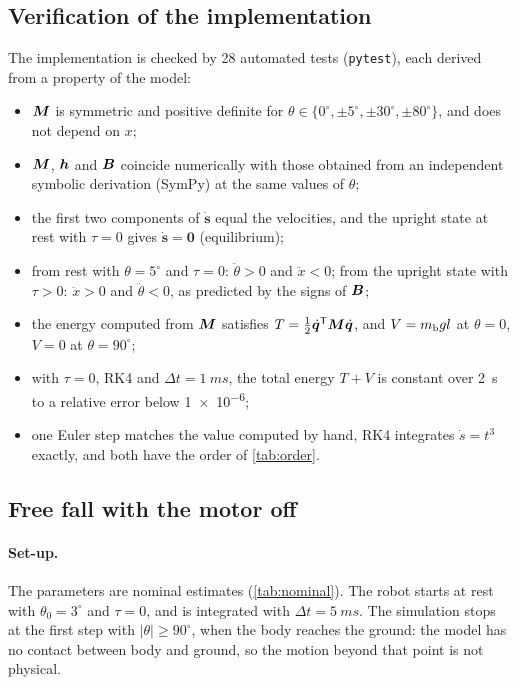 \subsection{Verification of the implementation}

The implementation is checked by 28 automated tests (\texttt{pytest}), each
derived from a property of the model:
\begin{itemize}
  \item $\bm{M}$ is symmetric and positive definite for
        $\theta\in\{0^\circ,\pm5^\circ,\pm30^\circ,\pm80^\circ\}$, and does
        not depend on $x$;
  \item $\bm{M}$, $\bm{h}$ and $\bm{B}$ coincide numerically with those obtained from an
        independent symbolic derivation (SymPy) at the same values of $\theta$;
  \item the first two components of $\dot{\bm s}$ equal the velocities, and
        the upright state at rest with $\tau = 0$ gives $\dot{\bm s} = \bm 0$
        (equilibrium);
  \item from rest with $\theta = 5^\circ$ and $\tau = 0$:
        $\ddot\theta > 0$ and $\ddot x < 0$; from the upright state with
        $\tau > 0$: $\ddot x > 0$ and $\ddot\theta < 0$, as predicted by the
        signs of $\bm{B}$;
  \item the energy computed from $\bm{M}$ satisfies $T = \frac12\dot{\bm{q}}^{\mathsf T}\bm{M}\dot{\bm{q}}$,
        and $V = m_{\mathrm b} g l$ at $\theta = 0$, $V = 0$ at $\theta = 90^\circ$;
  \item with $\tau = 0$, RK4 and $\Delta t = \SI{1}{ms}$, the total energy
        $T + V$ is constant over \SI{2}{s} to a relative error below
        \num{1e-6};
  \item one Euler step matches the value computed by hand, RK4 integrates
        $\dot s = t^3$ exactly, and both have the order of \cref{tab:order}.
\end{itemize}

\subsection{Free fall with the motor off}

\paragraph{Set-up.} The parameters are nominal estimates (\cref{tab:nominal}). The robot starts at rest with
$\theta_0 = 3^\circ$ and $\tau = 0$, and is integrated with
$\Delta t = \SI{5}{ms}$. The simulation stops at the first step with
$|\theta| \ge 90^\circ$, when the body reaches the ground: the model has no
contact between body and ground, so the motion beyond that point is not
physical.

